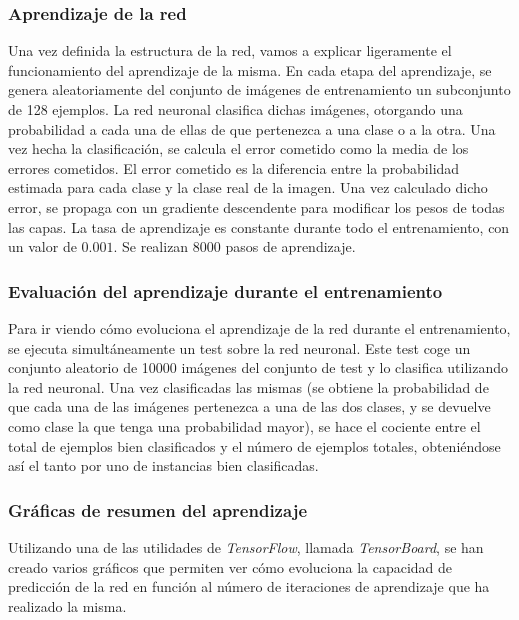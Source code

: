 \documentclass[11pt]{article}
\theoremstyle{plain}
\theoremstyle{definition}
\begin{document}
\subsubsection{Aprendizaje de la red}

Una vez definida la estructura de la red, vamos a explicar ligeramente
el funcionamiento del aprendizaje de la misma. En cada etapa del
aprendizaje, se genera aleatoriamente del conjunto de imágenes de
entrenamiento un subconjunto de 128 ejemplos. La red neuronal
clasifica dichas imágenes, otorgando una probabilidad a cada una de
ellas de que pertenezca a una clase o a la otra.  Una vez hecha la
clasificación, se calcula el error cometido como la media de los
errores cometidos. El error cometido es la diferencia entre la
probabilidad estimada para cada clase y la clase real de la imagen.
Una vez calculado dicho error, se propaga con un gradiente descendente
para modificar los pesos de todas las capas. La tasa de aprendizaje es
constante durante todo el entrenamiento, con un valor de $0.001$.
Se realizan 8000 pasos de aprendizaje.

\subsubsection{Evaluación del aprendizaje durante el entrenamiento}

Para ir viendo cómo evoluciona el aprendizaje de la red durante el
entrenamiento, se ejecuta simultáneamente un test sobre la red
neuronal. Este test coge un conjunto aleatorio de 10000 imágenes
del conjunto de test y lo clasifica utilizando la red neuronal.
Una vez clasificadas las mismas (se obtiene la probabilidad de que
cada una de las imágenes pertenezca a una de las dos clases, y se
devuelve como clase la que tenga una probabilidad mayor), se hace
el cociente entre el total de ejemplos bien clasificados y el número
de ejemplos totales, obteniéndose así el tanto por uno de instancias
bien clasificadas.

\subsubsection{Gráficas de resumen del aprendizaje}

Utilizando una de las utilidades de \textit{TensorFlow}, llamada
\textit{TensorBoard}, se han creado varios gráficos que permiten ver
cómo evoluciona la capacidad de predicción de la red en función al
número
de iteraciones de aprendizaje que ha realizado la misma.\\
\end{document}
